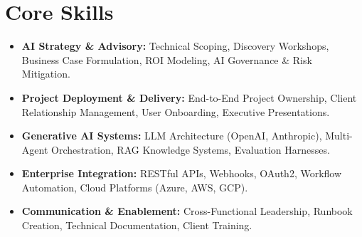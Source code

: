 \documentclass[a4paper,10pt]{article}
\begin{document}
\section{Core Skills}
\begin{itemize}
  \item \textbf{AI Strategy \& Advisory:} Technical Scoping, Discovery Workshops, Business Case Formulation, ROI Modeling, AI Governance \& Risk Mitigation.
  \item \textbf{Project Deployment \& Delivery:} End-to-End Project Ownership, Client Relationship Management, User Onboarding, Executive Presentations.
  \item \textbf{Generative AI Systems:} LLM Architecture (OpenAI, Anthropic), Multi-Agent Orchestration, RAG Knowledge Systems, Evaluation Harnesses.
  \item \textbf{Enterprise Integration:} RESTful APIs, Webhooks, OAuth2, Workflow Automation, Cloud Platforms (Azure, AWS, GCP).
  \item \textbf{Communication \& Enablement:} Cross-Functional Leadership, Runbook Creation, Technical Documentation, Client Training.
\end{itemize}
\end{document}
